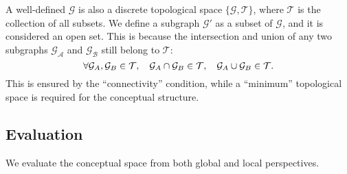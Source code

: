 A well-defined $\mathcal{G}$ is also a discrete topological space $\{\mathcal{G}, \mathcal{T}\}$, where $\mathcal{T}$ is the collection of all subsets. We define a subgraph $\mathcal{G'}$ as a subset of $\mathcal{G}$, and it is considered an open set. This is because the intersection and union of any two subgraphs $\mathcal{G_A}$ and $\mathcal{G_B}$ still belong to $\mathcal{T}$:
\begin{equation}
    \small \forall \mathcal{G}_A, \mathcal{G}_B \in \mathcal{T}, \quad  \mathcal{G}_A \cap \mathcal{G}_B \in \mathcal{T}, \quad \mathcal{G}_A \cup \mathcal{G}_B \in \mathcal{T}.
\end{equation}
This is ensured by the ``connectivity'' condition, while a ``minimum'' topological space is required for the conceptual structure.





\subsection{Evaluation}
We evaluate the conceptual space from both global and local perspectives. 

